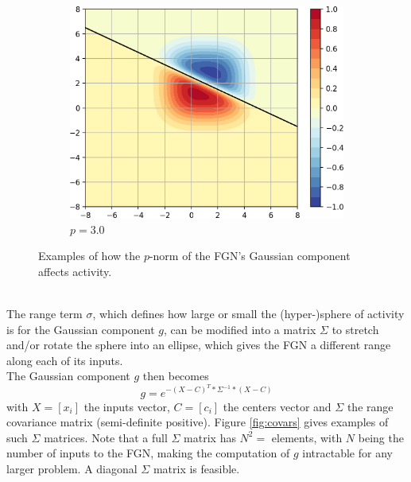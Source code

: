 \documentclass[12pt,oneside]{CUNY_PhD}
\begin{document}
\begin{figure}[!htbp]
\begin{subfigure}[t]{0.32\textwidth}
        \includegraphics[width=\textwidth]{images/Variants-Norms/ord3-cropped.png}
        \caption*{$p=3.0$}
    \end{subfigure}
    \caption{Examples of how the $p$-norm of the FGN's Gaussian component affects activity.}
    \label{fig:norms}
\end{figure}\\
\indent The range term $\sigma$, which defines how large or small the (hyper-)sphere of activity is for the Gaussian component $g$, can be modified into a matrix $\Sigma$ to stretch and/or rotate the sphere into an ellipse, which gives the FGN a different range along each of its inputs.\\
The Gaussian component $g$ then becomes
\[g = e^{-(X-C)^T * \Sigma^{-1} * (X-C)}\]
with $X=[x_i]$ the inputs vector, $C=[c_i]$ the centers vector and $\Sigma$ the range covariance matrix (semi-definite positive). Figure \ref{fig:covars} gives examples of such $\Sigma$ matrices. Note that a full $\Sigma$ matrix has $N^2=$ elements, with $N$ being the number of inputs to the FGN, making the computation of $g$ intractable for any larger problem. A diagonal $\Sigma$ matrix is feasible.
\end{document}
